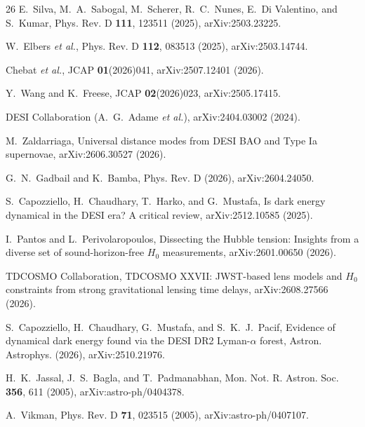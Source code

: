 \documentclass[aps,prd,preprint,superscriptaddress,nofootinbib]{revtex4-2}
\begin{document}
\begin{thebibliography}{26}
E.~Silva, M.~A.~Sabogal, M.~Scherer, R.~C.~Nunes, E.~Di Valentino, and S.~Kumar, Phys. Rev. D \textbf{111}, 123511 (2025), arXiv:2503.23225.

W.~Elbers \emph{et al.}, Phys. Rev. D \textbf{112}, 083513 (2025), arXiv:2503.14744.

Chebat \emph{et al.}, JCAP \textbf{01}(2026)041, arXiv:2507.12401 (2026).

Y.~Wang and K.~Freese, JCAP \textbf{02}(2026)023, arXiv:2505.17415.

DESI Collaboration (A.~G.~Adame \emph{et al.}), arXiv:2404.03002 (2024).

M.~Zaldarriaga, Universal distance modes from DESI BAO and Type Ia supernovae, arXiv:2606.30527 (2026).

G.~N.~Gadbail and K.~Bamba, Phys. Rev. D (2026), arXiv:2604.24050.

S.~Capozziello, H.~Chaudhary, T.~Harko, and G.~Mustafa, Is dark energy dynamical in the DESI era? A critical review, arXiv:2512.10585 (2025).

I.~Pantos and L.~Perivolaropoulos, Dissecting the Hubble tension: Insights from a diverse set of sound-horizon-free $H_0$ measurements, arXiv:2601.00650 (2026).

TDCOSMO Collaboration, TDCOSMO XXVII: JWST-based lens models and $H_0$ constraints from strong gravitational lensing time delays, arXiv:2608.27566 (2026).

S.~Capozziello, H.~Chaudhary, G.~Mustafa, and S.~K.~J.~Pacif, Evidence of dynamical dark energy found via the DESI DR2 Lyman-$\alpha$ forest, Astron. Astrophys. (2026), arXiv:2510.21976.

H.~K.~Jassal, J.~S.~Bagla, and T.~Padmanabhan, Mon. Not. R. Astron. Soc. \textbf{356}, 611 (2005), arXiv:astro-ph/0404378.

A.~Vikman, Phys. Rev. D \textbf{71}, 023515 (2005), arXiv:astro-ph/0407107.

\end{thebibliography}
\end{document}
